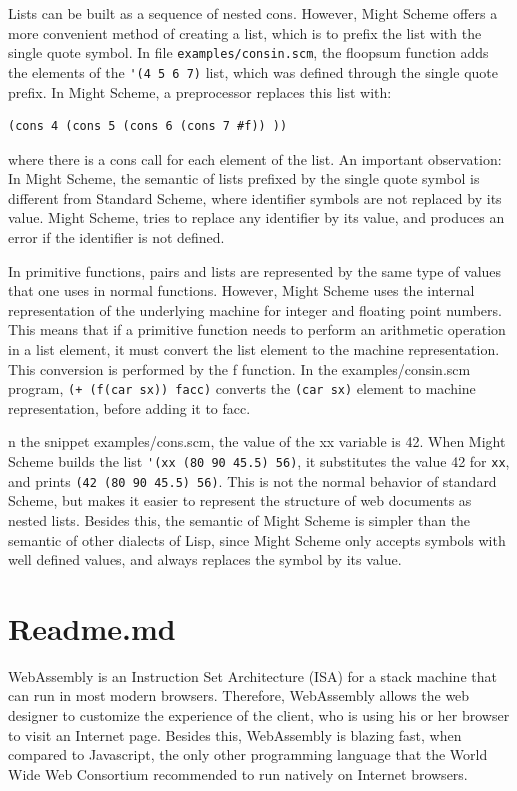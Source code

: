 \documentclass[a4paper,12pt]{book}
\begin{document}
Lists can be built as a sequence of nested cons. However,
Might Scheme offers a more convenient method of creating
a list, which is to prefix the list with the single quote symbol.
In file \verb|examples/consin.scm|, the floopsum function adds the
elements of the \verb|'(4 5 6 7)| list, which was defined through the
single quote prefix. In Might Scheme, a preprocessor replaces
this list with:
\begin{verbatim}
(cons 4 (cons 5 (cons 6 (cons 7 #f)) ))
\end{verbatim}
where there is a cons call for each element of the list. An important
observation: In Might Scheme, the semantic of lists prefixed by the
single quote symbol is different from Standard Scheme, where
identifier symbols are not replaced by its value. Might Scheme,
tries to replace any identifier by its value, and produces an error
if the identifier is not defined.

In primitive functions, pairs and lists are represented by the same
type of values that one uses in normal functions. However, Might
Scheme uses the internal representation of the underlying machine
for integer and floating point numbers. This means that if a primitive
function needs to perform an arithmetic operation in a list element,
it must convert the list element to the machine representation. This
conversion is performed by the f function. In the examples/consin.scm
program, \verb|(+ (f(car sx)) facc)| converts the \verb|(car sx)|
element to machine representation, before adding it to facc. 

n the snippet examples/cons.scm, the value of the xx variable is 42.
When Might Scheme builds the list \verb|'(xx (80 90 45.5) 56)|,
it substitutes the value 42 for \verb|xx|, and
prints \verb|(42 (80 90 45.5) 56)|. This is not the
normal behavior of standard Scheme, but makes it easier to represent
the structure of web documents as nested lists. Besides this, the
semantic of Might Scheme is simpler than the semantic of other
dialects of Lisp, since Might Scheme only accepts symbols
with well defined values, and always replaces the symbol by its value.






\chapter*{Readme.md}

WebAssembly is an Instruction Set Architecture (ISA) for
a stack machine that can run in most modern browsers.
Therefore, WebAssembly allows the web designer to
customize the experience of the client, who is using
his or her browser to visit an Internet page. Besides
this, WebAssembly is blazing fast, when compared to
Javascript, the only other programming language that
the World Wide Web Consortium recommended to run natively
on Internet browsers.
\end{document}
